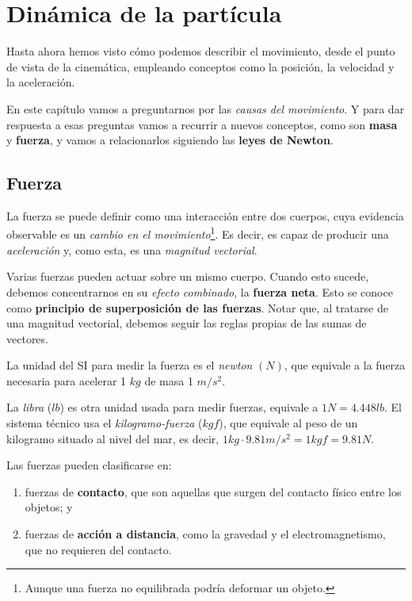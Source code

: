 \section{Dinámica de la partícula}

Hasta ahora hemos visto cómo podemos describir el movimiento,
desde el punto de vista de  la cinemática,
empleando conceptos como la posición, la velocidad y la aceleración.

En este capítulo vamos a preguntarnos por las \textit{causas del  movimiento}.
Y para dar respuesta a esas preguntas vamos a recurrir a nuevos conceptos,
como son \textbf{masa} y \textbf{fuerza},
y vamos a relacionarlos siguiendo las \textbf{leyes de Newton}.

\subsection{Fuerza}

La fuerza se puede definir como una interacción entre dos cuerpos,
cuya evidencia observable es un \textit{cambio en el movimiento}\footnote{Aunque una fuerza no equilibrada podría deformar un objeto.}.
Es decir, es capaz de producir una \textit{aceleración} y,
como esta, es una \textit{magnitud vectorial}.

Varias fuerzas pueden actuar sobre un mismo cuerpo.
Cuando esto sucede, debemos concentrarnos en su \textit{efecto combinado},
la \textbf{fuerza neta}.
Esto se conoce como \textbf{principio de superposición de las fuerzas}.
Notar que, al tratarse de una magnitud vectorial,
debemos seguir las reglas propias de las sumas de vectores.

La unidad del SI para medir la fuerza es el \textit{newton} \((N)\),
que equivale a la fuerza necesaria para acelerar 1 \(kg\) de masa 
1 \(m/s^{2}\).

La \textit{libra} (\(lb\)) es otra unidad usada para medir fuerzas,
equivale a \(1N = 4.448lb\).
El sistema técnico usa el \textit{kilogramo-fuerza} (\(kgf\)),
que equivale al peso de un kilogramo situado al nivel del mar,
es decir, \(1kg \cdot 9.81m/s^{2} = 1kgf = 9.81N\).

Las fuerzas pueden clasificarse en:
\begin{enumerate}
    \item fuerzas de \textbf{contacto}, que son aquellas que 
    surgen del contacto físico entre los objetos; y
    \item fuerzas de \textbf{acción a distancia}, 
    como la gravedad y el electromagnetismo,
    que no requieren del contacto. 
\end{enumerate}

